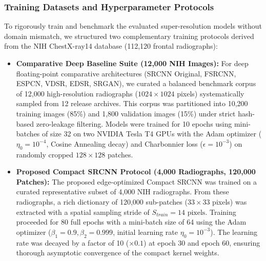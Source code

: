 \documentclass[conference]{IEEEtran}
\begin{document}
\subsubsection{Training Datasets and Hyperparameter Protocols}
To rigorously train and benchmark the evaluated super-resolution models without domain mismatch, we structured two complementary training protocols derived from the NIH ChestX-ray14 database \cite{wang2017chestxray} (112,120 frontal radiographs):
\begin{itemize}
    \item \textbf{Comparative Deep Baseline Suite (12,000 NIH Images):} For deep floating-point comparative architectures (SRCNN Original, FSRCNN, ESPCN, VDSR, EDSR, SRGAN), we curated a balanced benchmark corpus of 12,000 high-resolution radiographs ($1024 \times 1024$ pixels) systematically sampled from 12 release archives. This corpus was partitioned into 10,200 training images (85\%) and 1,800 validation images (15\%) under strict hash-based zero-leakage filtering. Models were trained for 10 epochs using mini-batches of size 32 on two NVIDIA Tesla T4 GPUs with the Adam optimizer ($\eta_0 = 10^{-4}$, Cosine Annealing decay) and Charbonnier loss ($\epsilon = 10^{-3}$) on randomly cropped $128 \times 128$ patches.
    \item \textbf{Proposed Compact SRCNN Protocol (4,000 Radiographs, 120,000 Patches):} The proposed edge-optimized Compact SRCNN was trained on a curated representative subset of 4,000 NIH radiographs. From these radiographs, a rich dictionary of 120,000 sub-patches ($33 \times 33$ pixels) was extracted with a spatial sampling stride of $S_{train} = 14\text{ pixels}$. Training proceeded for 80 full epochs with a mini-batch size of 64 using the Adam optimizer ($\beta_1 = 0.9, \beta_2 = 0.999$, initial learning rate $\eta_0 = 10^{-3}$). The learning rate was decayed by a factor of 10 ($\times 0.1$) at epoch 30 and epoch 60, ensuring thorough asymptotic convergence of the compact kernel weights.
\end{itemize}
\end{document}
